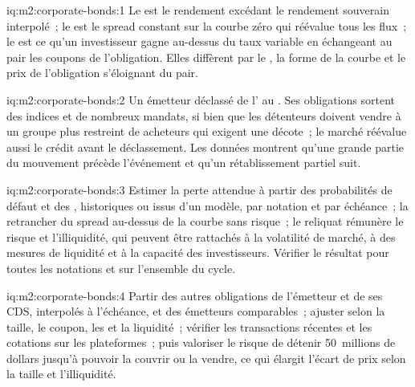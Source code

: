 \begin{solution}{iq:m2:corporate-bonds:1}
Le  est le rendement excédant le rendement souverain interpolé~; le  est le
spread constant sur la courbe zéro qui réévalue tous les flux~; le 
est ce qu'un investisseur gagne au-dessus du taux variable en échangeant au pair
les coupons de l'obligation. Elles diffèrent par le , la forme de la courbe et le
prix de l'obligation s'éloignant du pair.
\end{solution}

\begin{solution}{iq:m2:corporate-bonds:2}
Un émetteur déclassé de l' au . Ses obligations sortent
des indices  et de nombreux mandats, si bien que les détenteurs doivent vendre à un groupe plus restreint de
acheteurs qui exigent une décote~; le marché réévalue aussi le crédit avant le déclassement.
Les données montrent qu'une grande partie du mouvement précède l'événement et qu'un rétablissement partiel suit.
\end{solution}

\begin{solution}{iq:m2:corporate-bonds:3}
Estimer la perte attendue à partir des probabilités de défaut et des , historiques ou
issus d'un modèle, par notation et par échéance~; la retrancher du spread au-dessus de la
courbe sans risque~; le reliquat rémunère le risque et l'illiquidité, qui peuvent être
rattachés à la volatilité de marché, à des mesures de liquidité et à la capacité des investisseurs. Vérifier le résultat
pour toutes les notations et sur l'ensemble du cycle.
\end{solution}

\begin{solution}{iq:m2:corporate-bonds:4}
Partir des autres obligations de l'émetteur et de ses CDS, interpolés à l'échéance, et des
émetteurs comparables~; ajuster selon la taille, le coupon, les  et la liquidité~; vérifier
les transactions récentes et les cotations sur les plateformes~; puis valoriser le risque de détenir 50~millions de dollars jusqu'à
pouvoir la couvrir ou la vendre, ce qui élargit l'écart de prix selon la taille et l'illiquidité.
\end{solution}

